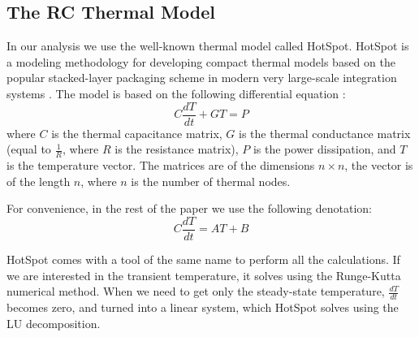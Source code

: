 \subsection{The RC Thermal Model}
In our analysis we use the well-known thermal model called HotSpot. HotSpot is a modeling methodology for developing compact thermal models based on the popular stacked-layer packaging scheme in modern very large-scale integration systems \cite{huang2006}. The model is based on the following differential equation \cite{rao2008}:
\[
  C \frac{dT}{dt} + G T = P
\]
where $C$ is the thermal capacitance matrix, $G$ is the thermal conductance matrix (equal to $\frac{1}{R}$, where $R$ is the resistance matrix), $P$ is the power dissipation, and $T$ is the temperature vector. The matrices are of the dimensions $n \times n$, the vector is of the length $n$, where $n$ is the number of thermal nodes.

For convenience, in the rest of the paper we use the following denotation:
\begin{equation} \label{eq:initial}
  C \frac{dT}{dt} = A T + B
\end{equation}

HotSpot comes with a tool of the same name to perform all the calculations. If we are interested in the transient temperature, it solves  using the Runge-Kutta numerical method. When we need to get only the steady-state temperature, $\frac{dT}{dt}$ becomes zero, and  turned into a linear system, which HotSpot solves using the LU decomposition.
